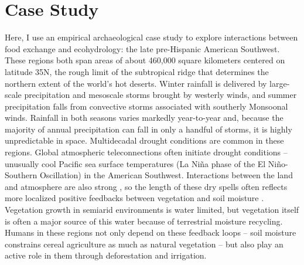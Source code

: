 \documentclass[fleqn,10pt]{wlscirep}
\begin{document}




\section*{Case Study}

Here, I use an empirical archaeological case study to explore interactions between food exchange and ecohydrology: the late pre-Hispanic American Southwest. These regions both span areas of about 460,000 square kilometers centered on latitude 35\degree N, the rough limit of the subtropical ridge that determines the northern extent of the world's hot deserts. Winter rainfall is delivered by large-scale precipitation and mesoscale storms brought by westerly winds, and summer precipitation falls from convective storms associated with southerly Monsoonal winds. Rainfall in both seasons varies markedly year-to-year and, because the majority of annual precipitation can fall in only a handful of storms, it is highly unpredictable in space. Multidecadal drought conditions are common in these regions. Global atmospheric teleconnections often initiate drought conditions -- unusually cool Pacific sea surface temperatures (La Ni\~{n}a phase of the El Ni\~{n}o-Southern Oscillation) in the American Southwest. Interactions between the land and atmosphere are also strong \cite{Koster2004RegionsPrecipitation}, so the length of these dry spells often reflects more localized positive feedbacks between vegetation and soil moisture \cite{Ault2014AssessingData}. Vegetation growth in semiarid environments is water limited, but vegetation itself is often a major source of this  water because of terrestrial moisture recycling. Humans in these regions not only depend on these feedback loops -- soil moisture constrains cereal agriculture as much as natural vegetation -- but also play an active role in them through deforestation and irrigation.
\end{document}
